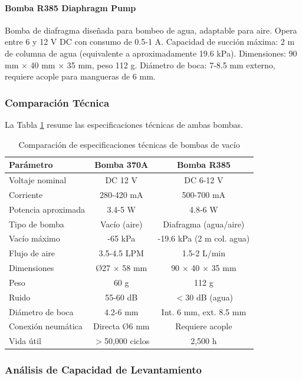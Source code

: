\paragraph{Bomba R385 Diaphragm Pump}

Bomba de diafragma diseñada para bombeo de agua, adaptable para aire. Opera entre 6 y 12 V DC con consumo de 0.5-1 A. Capacidad de succión máxima: 2 m de columna de agua (equivalente a aproximadamente 19.6 kPa). Dimensiones: 90 mm × 40 mm × 35 mm, peso 112 g. Diámetro de boca: 7-8.5 mm externo, requiere acople para mangueras de 6 mm.

\subsubsection{Comparación Técnica}

La Tabla \ref{tab:comparacion_bombas} resume las especificaciones técnicas de ambas bombas.

\begin{table}[H]
\centering
\caption{Comparación de especificaciones técnicas de bombas de vacío}
\label{tab:comparacion_bombas}
\small
\begin{tabular}{|l|c|c|}
\hline
\textbf{Parámetro} & \textbf{Bomba 370A} & \textbf{Bomba R385} \\
\hline
Voltaje nominal & DC 12 V & DC 6-12 V \\
Corriente & 280-420 mA & 500-700 mA \\
Potencia aproximada & 3.4-5 W & 4.8-6 W \\
Tipo de bomba & Vacío (aire) & Diafragma (agua/aire) \\
Vacío máximo & -65 kPa & -19.6 kPa (2 m col. agua) \\
Flujo de aire & 3.5-4.5 LPM & 1.5-2 L/min \\
Dimensiones & Ø27 × 58 mm & 90 × 40 × 35 mm \\
Peso & 60 g & 112 g \\
Ruido & 55-60 dB & $<$30 dB (agua) \\
Diámetro de boca & 4.2-6 mm & Int. 6 mm, ext. 8.5 mm \\
Conexión neumática & Directa Ø6 mm & Requiere acople \\
Vida útil & $>$50,000 ciclos & 2,500 h \\
\hline
\end{tabular}
\end{table}

\subsubsection{Análisis de Capacidad de Levantamiento}

